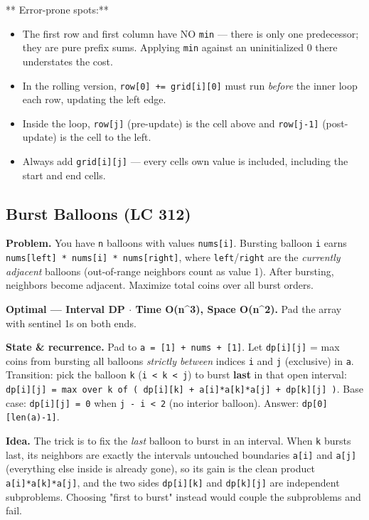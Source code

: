 \documentclass[11pt]{article}
\providecommand{\tightlist}{\setlength{\itemsep}{1pt}\setlength{\parskip}{0pt}}
\begin{document}
** Error-prone spots:**

\begin{itemize}
\tightlist
\item
  The first row and first column have NO \texttt{min} --- there is only one predecessor; they are pure prefix sums. Applying \texttt{min} against an uninitialized 0 there understates the cost.
\item
  In the rolling version, \texttt{row{[}0{]}\ +=\ grid{[}i{]}{[}0{]}} must run \emph{before} the inner loop each row, updating the left edge.
\item
  Inside the loop, \texttt{row{[}j{]}} (pre-update) is the cell above and \texttt{row{[}j-1{]}} (post-update) is the cell to the left.
\item
  Always add \texttt{grid{[}i{]}{[}j{]}} --- every cell\textquotesingle s own value is included, including the start and end cells.
\end{itemize}

\subsection{Burst Balloons (LC 312)}\label{burst-balloons-lc-312}

\textbf{Problem.} You have \texttt{n} balloons with values \texttt{nums{[}i{]}}. Bursting balloon \texttt{i} earns \texttt{nums{[}left{]}\ *\ nums{[}i{]}\ *\ nums{[}right{]}}, where \texttt{left}/\texttt{right} are the \emph{currently adjacent} balloons (out-of-range neighbors count as value 1). After bursting, neighbors become adjacent. Maximize total coins over all burst orders.

\textbf{Optimal --- Interval DP \(\cdot\) Time O(n\^{}3), Space O(n\^{}2).} Pad the array with sentinel 1s on both ends.

\textbf{State \& recurrence.} Pad to \texttt{a\ =\ {[}1{]}\ +\ nums\ +\ {[}1{]}}. Let \texttt{dp{[}i{]}{[}j{]}} = max coins from bursting all balloons \emph{strictly between} indices \texttt{i} and \texttt{j} (exclusive) in \texttt{a}. Transition: pick the balloon \texttt{k} (\texttt{i\ \textless{}\ k\ \textless{}\ j}) to burst \textbf{last} in that open interval:
\texttt{dp{[}i{]}{[}j{]}\ =\ max\ over\ k\ of\ (\ dp{[}i{]}{[}k{]}\ +\ a{[}i{]}*a{[}k{]}*a{[}j{]}\ +\ dp{[}k{]}{[}j{]}\ )}.
Base case: \texttt{dp{[}i{]}{[}j{]}\ =\ 0} when \texttt{j\ -\ i\ \textless{}\ 2} (no interior balloon). Answer: \texttt{dp{[}0{]}{[}len(a)-1{]}}.

\textbf{Idea.} The trick is to fix the \emph{last} balloon to burst in an interval. When \texttt{k} bursts last, its neighbors are exactly the interval\textquotesingle s untouched boundaries \texttt{a{[}i{]}} and \texttt{a{[}j{]}} (everything else inside is already gone), so its gain is the clean product \texttt{a{[}i{]}*a{[}k{]}*a{[}j{]}}, and the two sides \texttt{dp{[}i{]}{[}k{]}} and \texttt{dp{[}k{]}{[}j{]}} are independent subproblems. Choosing "first to burst" instead would couple the subproblems and fail.
\end{document}
